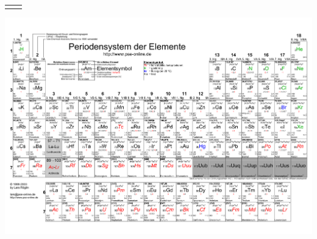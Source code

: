 \documentclass[fs, footer]{latex4ei}
\begin{document}
\begin{multicols*}{4}
{{\begin{tabular*}{\columnwidth}{@{\extracolsep}ll@{}}
	\cbrule
	\end{tabular*}
}	
}



\end{multicols*}

\hspace{-5mm}\includegraphics[width = 29.3cm]{./img/pse.pdf}


\end{document}
